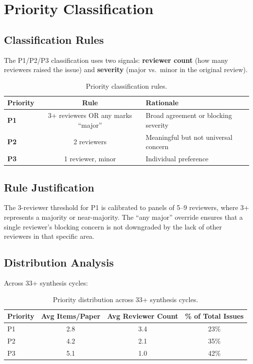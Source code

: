\section{Priority Classification}

\subsection{Classification Rules}

The P1/P2/P3 classification uses two signals: \textbf{reviewer count} (how many reviewers raised the issue) and \textbf{severity} (major vs.\ minor in the original review).

\begin{table}[h]
\centering
\begin{tabular}{lcl}
\toprule
Priority & Rule & Rationale \\
\midrule
\textbf{P1} & 3+ reviewers OR any marks ``major'' & Broad agreement or blocking severity \\
\textbf{P2} & 2 reviewers & Meaningful but not universal concern \\
\textbf{P3} & 1 reviewer, minor & Individual preference \\
\bottomrule
\end{tabular}
\caption{Priority classification rules.}
\end{table}

\subsection{Rule Justification}

The 3-reviewer threshold for P1 is calibrated to panels of 5--9 reviewers, where 3+ represents a majority or near-majority. The ``any major'' override ensures that a single reviewer's blocking concern is not downgraded by the lack of other reviewers in that specific area.

\subsection{Distribution Analysis}

Across 33+ synthesis cycles:

\begin{table}[h]
\centering
\begin{tabular}{lccc}
\toprule
Priority & Avg Items/Paper & Avg Reviewer Count & \% of Total Issues \\
\midrule
P1 & 2.8 & 3.4 & 23\% \\
P2 & 4.2 & 2.1 & 35\% \\
P3 & 5.1 & 1.0 & 42\% \\
\bottomrule
\end{tabular}
\caption{Priority distribution across 33+ synthesis cycles.}
\end{table}

